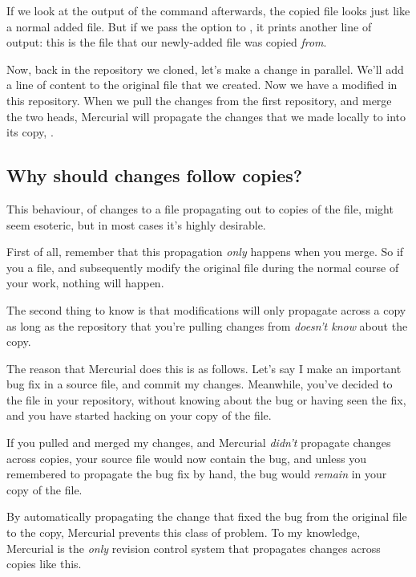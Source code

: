 If we look at the output of the  command afterwards, the
copied file looks just like a normal added file.
But if we pass the  option to , it
prints another line of output: this is the file that our newly-added
file was copied \emph{from}.

Now, back in the repository we cloned, let's make a change in
parallel.  We'll add a line of content to the original file that we
created.
Now we have a modified  in this repository.  When we
pull the changes from the first repository, and merge the two heads,
Mercurial will propagate the changes that we made locally to
 into its copy, .

\subsection{Why should changes follow copies?}
\label{sec:daily:why-copy}

This behaviour, of changes to a file propagating out to copies of the
file, might seem esoteric, but in most cases it's highly desirable.

First of all, remember that this propagation \emph{only} happens when
you merge.  So if you  a file, and subsequently modify the
original file during the normal course of your work, nothing will
happen.

The second thing to know is that modifications will only propagate
across a copy as long as the repository that you're pulling changes
from \emph{doesn't know} about the copy.

The reason that Mercurial does this is as follows.  Let's say I make
an important bug fix in a source file, and commit my changes.
Meanwhile, you've decided to  the file in your repository,
without knowing about the bug or having seen the fix, and you have
started hacking on your copy of the file.

If you pulled and merged my changes, and Mercurial \emph{didn't}
propagate changes across copies, your source file would now contain
the bug, and unless you remembered to propagate the bug fix by hand,
the bug would \emph{remain} in your copy of the file.

By automatically propagating the change that fixed the bug from the
original file to the copy, Mercurial prevents this class of problem.
To my knowledge, Mercurial is the \emph{only} revision control system
that propagates changes across copies like this.

